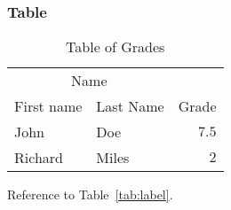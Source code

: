 \documentclass[
10pt, %
a4paper, %
oneside, %
headinclude,footinclude, %
BCOR5mm, %
]{scrartcl}
\begin{document}
\subsubsection{Table}

\lipsum[13] %

\begin{table}[hbt]
\caption{Table of Grades}
\centering
\begin{tabular}{llr}
\toprule
\multicolumn{2}{c}{Name} \\
\cmidrule(r){1-2}
First name & Last Name & Grade \\
\midrule
John & Doe & $7.5$ \\
Richard & Miles & $2$ \\
\bottomrule
\end{tabular}
\label{tab:label}
\end{table}

Reference to Table~\vref{tab:label}. %





%


\end{document}
